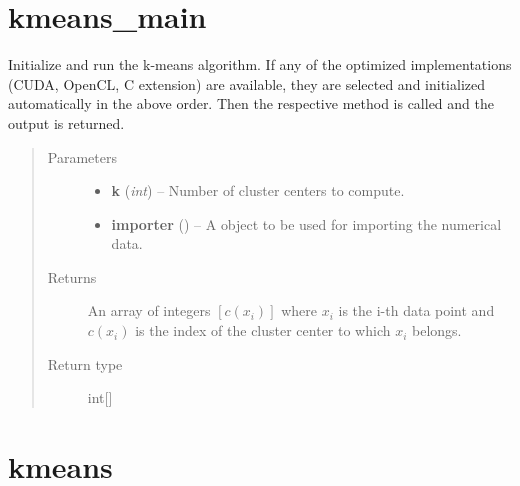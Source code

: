 \documentclass[letterpaper,10pt,english]{sphinxmanual}
\begin{document}
\section{kmeans\_main}
\label{kmeans:module-kmeans_main}\label{kmeans:kmeans-main}

\begin{fulllineitems}
\label{kmeans:kmeans_main.kmeans}
Initialize and run the k-means algorithm. If any of the optimized implementations (CUDA, OpenCL, C extension) are
available, they are selected and initialized automatically in the above order. Then the respective
 method is called and the output is returned.
\begin{quote}\begin{description}
\item[{Parameters}] \leavevmode\begin{itemize}
\item {} 
\textbf{k} (\emph{int}) -- Number of cluster centers to compute.

\item {} 
\textbf{importer} ({\hyperref[common:common_data_importer.CommonDataImporter]{}}) -- A {\hyperref[common:common_data_importer.CommonDataImporter]{}} object to be used for importing the numerical data.

\end{itemize}

\item[{Returns}] \leavevmode
An array of integers \([c(x_i)]\) where \(x_i\) is the i-th data point and
\(c(x_i)\) is the index of the cluster center to which \(x_i\) belongs.

\item[{Return type}] \leavevmode
int{[}{]}

\end{description}\end{quote}

\end{fulllineitems}



\section{kmeans}
\label{kmeans:module-kmeans}\label{kmeans:kmeans}
\end{document}
